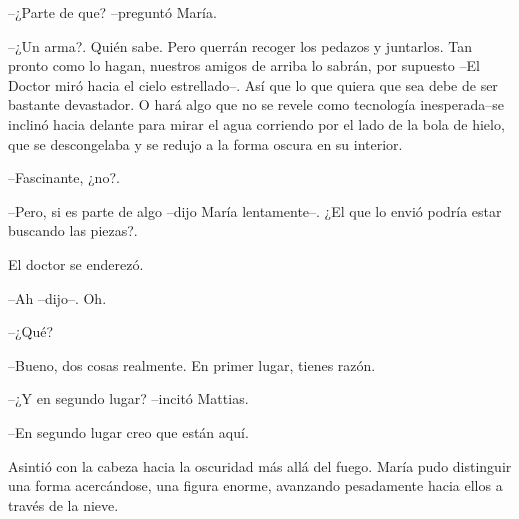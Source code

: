 --¿Parte de que? --preguntó María.



--¿Un arma?. Quién sabe. Pero querrán recoger los pedazos y juntarlos. Tan pronto como lo hagan, nuestros amigos de arriba lo sabrán, por supuesto --El Doctor miró hacia el cielo estrellado--. Así que lo que quiera que sea debe de ser bastante devastador. O hará algo que no se revele como tecnología inesperada--se inclinó hacia delante para mirar el agua corriendo por el lado de la bola de hielo, que se descongelaba y se redujo a la forma oscura en su interior. 


--Fascinante, ¿no?.



--Pero, si es parte de algo --dijo María lentamente--. ¿El que lo envió podría estar buscando las piezas?.



El doctor se enderezó. 


--Ah --dijo--. Oh.



--¿Qué?



--Bueno, dos cosas realmente. En primer lugar, tienes razón.



--¿Y en segundo lugar? --incitó Mattias.



--En segundo lugar creo que están aquí.



Asintió con la cabeza hacia la oscuridad más allá del fuego. María pudo distinguir una forma acercándose, una figura enorme, avanzando pesadamente hacia ellos a través de la nieve.
